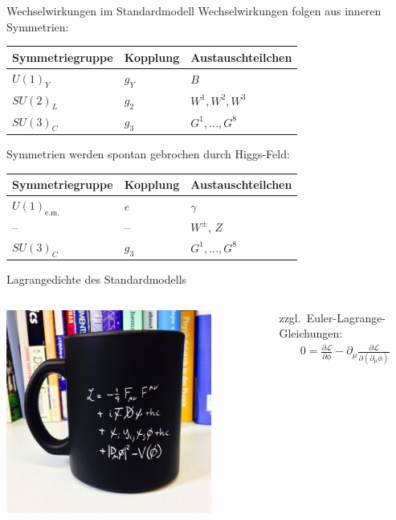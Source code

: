 \documentclass[hyperref={pdfpagelabels=false},ngerman]{beamer}
\newcommand{\Lagr}{\mathcal{L}}
\begin{document}
\begin{frame}{Wechselwirkungen im Standardmodell}
  Wechselwirkungen folgen aus inneren Symmetrien:
  \begin{center}
    \begin{tabular}{lll}
      \toprule
      Symmetriegruppe & Kopplung & Austauschteilchen\\
      \midrule
      $U(1)_Y$  & $g_Y$ & $B$ \\
      $SU(2)_L$ & $g_2$ & $W^1, W^2, W^3$ \\
      $SU(3)_C$ & $g_3$ & $G^1, \dots, G^8$ \\
      \bottomrule
    \end{tabular}
  \end{center}
  Symmetrien werden spontan gebrochen durch Higgs-Feld:
  \begin{center}
    \begin{tabular}{lll}
      \toprule
      Symmetriegruppe & Kopplung & Austauschteilchen\\
      \midrule
      $U(1)_\text{e.m.}$ & $e$ & $\gamma$ \\
      -- & -- & $W^{\pm}$, $Z$ \\
      $SU(3)_C$ & $g_3$ & $G^1, \dots, G^8$ \\
      \bottomrule
    \end{tabular}
  \end{center}
\end{frame}

\begin{frame}{Lagrangedichte des Standardmodells}
  \begin{columns}
    \begin{center}
      \includegraphics[width=0.8\textwidth]{images/cup.png}
    \end{center}
    zzgl.\ Euler-Lagrange-Gleichungen:
    \begin{align*}
      0 = \frac{\partial\Lagr}{\partial\phi} - \partial_\mu \frac{\partial\Lagr}{\partial(\partial_\mu\phi)}
    \end{align*}
  \end{columns}
\end{frame}
\end{document}
